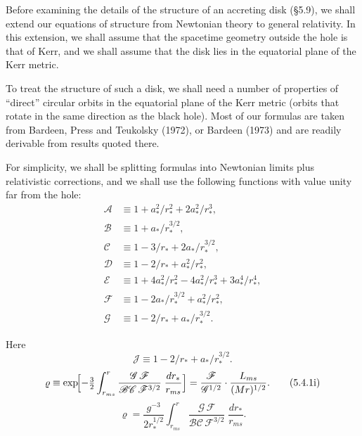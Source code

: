 

Before examining the details of the structure of an accreting disk (\S5.9),
we shall extend our equations of structure from Newtonian theory to general
relativity.  In this extension, we shall assume that the spacetime geometry
outside the hole is that of Kerr, and we shall assume that the disk lies in the
equatorial plane of the Kerr metric.

To treat the structure of such a disk, we shall need a number of properties
of ``direct'' circular orbits in the equatorial plane of the Kerr metric (orbits that
rotate in the same direction as the black hole).  Most of our formulas are taken
from Bardeen, Press and Teukolsky (1972)\cite{Bardeen1972}, or Bardeen (1973)\cite{Bardeen1973} and are readily
derivable from results quoted there.

For simplicity, we shall be splitting formulas into Newtonian limits plus relativistic
corrections, and we shall use the following functions with value unity far
from the hole:
%
\begin{align}
\mathscr{A} &\equiv 1 + a_*^2/r_*^2 + 2a_*^2/r_*^3 , \tag{5.4.1a}\\[4pt]
\mathscr{B} &\equiv 1 + a_*/r_*^{3/2} , \tag{5.4.1b}\\[4pt]
\mathscr{C} &\equiv 1 - 3/r_* + 2a_*/r_*^{3/2} , \tag{5.4.1c}\\[4pt]
\mathscr{D} &\equiv 1 - 2/r_* + a_*^2/r_*^2 , \tag{5.4.1d}\\[4pt]
\mathscr{E} &\equiv 1 + 4a_*^2/r_*^2 - 4a_*^2/r_*^3 + 3a_*^4/r_*^4 , \tag{5.4.1e}\\[4pt]
\mathscr{F} &\equiv 1 - 2a_*/r_*^{3/2} + a_*^2/r_*^2 , \tag{5.4.1f}\\[4pt]
\mathscr{G} &\equiv 1 - 2/r_* + a_*/r_*^{3/2} . \tag{5.4.1g}
\end{align}

Here
\begin{equation}
\mathscr{J} \equiv 1 - 2/r_* + a_* /r_*^{3/2} . \tag{5.4.1h}
\end{equation}
%
\begin{equation}
\varrho \equiv \exp\!\Bigl[-\tfrac{3}{2}\int_{r_{ms}}^{r}\frac{\mathscr{G}\,\mathscr{F}}
{\mathscr{B}\mathscr{C}\,\mathscr{F}^{3/2}}\;\frac{dr_*}{r_{ms}}\Bigr]
= \frac{\mathscr{F}}{\mathscr{G}^{1/2}}\cdot\frac{L_{ms}}{(Mr)^{1/2}}.
\tag{5.4.1i}
\end{equation}
%
\begin{equation}
\varrho = \frac{g^{-3}}{2r_*^{1/2}}\int_{r_{ms}}^{r}
\frac{\mathscr{G}\,\mathscr{F}}
{\mathscr{B}\mathscr{C}\,\mathscr{F}^{3/2}}
\;\frac{dr_*}{r_{ms}}.
\tag{5.4.1j}
\end{equation}

